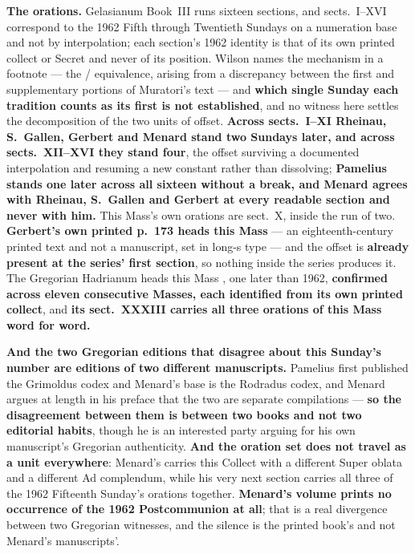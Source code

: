 \textbf{The orations.} Gelasianum Book~III runs sixteen sections, and
sects.~I--XVI correspond to the 1962 Fifth through Twentieth Sundays on a
numeration base and not by interpolation; each section's 1962 identity is that
of its own printed collect or Secret and never of its position. Wilson names
the mechanism in a footnote --- the  /  equivalence, arising from a discrepancy between the first
and supplementary portions of Muratori's text --- and \textbf{which single
Sunday each tradition counts as its first is not established}, and no witness
here settles the decomposition of the two units of offset.
\textbf{Across sects.~I--XI Rheinau, S.~Gallen, Gerbert and Menard stand two
Sundays later, and across sects.~XII--XVI they stand four}, the offset surviving
a documented interpolation and resuming a new constant rather than dissolving;
\textbf{Pamelius stands one later across all sixteen without a break, and Menard
agrees with Rheinau, S.~Gallen and Gerbert at every readable section and never
with him.} This Mass's own orations are sect.~X, inside the run of two.
\textbf{Gerbert's own printed p.~173 heads this Mass } ---
an eighteenth-century printed text and not a manuscript, set in long-s type --- and the offset is \textbf{already present at the series'
first section}, so nothing inside the series produces it. The Gregorian
Hadrianum heads this Mass , one later than
1962, \textbf{confirmed across eleven consecutive Masses, each identified from
its own printed collect}, and \textbf{its sect.~XXXIII carries all three
orations of this Mass word for word.}

\textbf{And the two Gregorian editions that disagree about this Sunday's number
are editions of two different manuscripts.} Pamelius first published the
Grimoldus codex and Menard's base is the Rodradus codex, and Menard argues at
length in his preface that the two are separate compilations --- \textbf{so the
disagreement between them is between two books and not two editorial habits},
though he is an interested party arguing for his own manuscript's Gregorian
authenticity. \textbf{And the oration set does not travel as a unit
everywhere}: Menard's  carries this Collect with a
different Super oblata and a different Ad complendum, while his very next
section carries all three of the 1962 Fifteenth Sunday's orations together.
\textbf{Menard's volume prints no occurrence of the 1962 Postcommunion at all};
that is a real divergence between two Gregorian witnesses, and the silence is
the printed book's and not Menard's manuscripts'.

